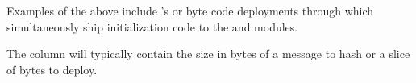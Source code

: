 Examples of the above include 's or byte code deployments through  which simultaneously ship initialization code to the \romMod{} and \kecMod{} modules.

\saNote{} The \microTotalSize{} column will typically contain the size in bytes of a message to hash or a slice of bytes to deploy.

